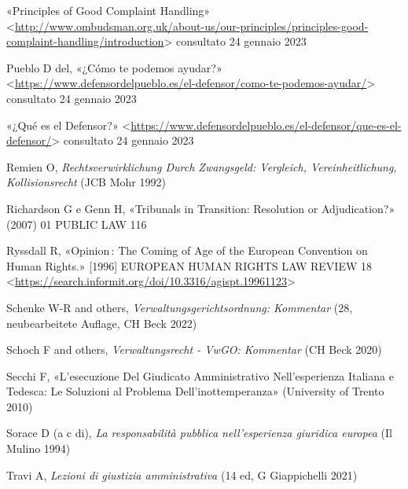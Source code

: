 \documentclass[12pt,it,a4paper,]{report}
\newlength{\cslhangindent}
\newenvironment{CSLReferences}[2] %
 {%
  \setlength{\parindent}{0pt}
  \ifodd #1 \everypar{\setlength{\hangindent}{\cslhangindent}}\ignorespaces\fi
  \ifnum #2 > 0
  \setlength{\parskip}{#2\baselineskip}
  \fi
 }%
 {}
\begin{document}
\begin{CSLReferences}{0}{0}
\leavevmode{}%
{«Principles of {Good Complaint Handling}»}
\textless{}\url{http://www.ombudsman.org.uk/about-us/our-principles/principles-good-complaint-handling/introduction}\textgreater{}
consultato 24 gennaio 2023

\leavevmode{}%
Pueblo D del, {«¿Cómo te podemos ayudar?»}
\textless{}\url{https://www.defensordelpueblo.es/el-defensor/como-te-podemos-ayudar/}\textgreater{}
consultato 24 gennaio 2023

\leavevmode{}%
{«¿Qué es el Defensor?»}
\textless{}\url{https://www.defensordelpueblo.es/el-defensor/que-es-el-defensor/}\textgreater{}
consultato 24 gennaio 2023

\leavevmode{}%
Remien O, \emph{Rechtsverwirklichung Durch {Zwangsgeld}: {Vergleich},
{Vereinheitlichung}, {Kollisionsrecht}} ({JCB Mohr} 1992)

\leavevmode{}%
Richardson G e Genn H, {«Tribunals in Transition: Resolution or
Adjudication?»} (2007) 01 PUBLIC LAW 116

\leavevmode{}%
Ryssdall R, {«Opinion : The Coming of Age of the {European Convention}
on {Human Rights}.»} {[}1996{]} EUROPEAN HUMAN RIGHTS LAW REVIEW 18
\textless{}\url{https://search.informit.org/doi/10.3316/agispt.19961123}\textgreater{}

\leavevmode{}%
Schenke W-R and others, \emph{Verwaltungsgerichtsordnung: Kommentar}
(28, neubearbeitete Auflage, {CH Beck} 2022)

\leavevmode{}%
Schoch F and others, \emph{Verwaltungsrecht - VwGO: Kommentar} ({CH
Beck} 2020)

\leavevmode{}%
Secchi F, {«L'esecuzione Del Giudicato Amministrativo Nell'esperienza
Italiana e Tedesca: Le Soluzioni al Problema Dell'inottemperanza»}
({University of Trento} 2010)

\leavevmode{}%
Sorace D (a c di), \emph{La responsabilità pubblica nell'esperienza
giuridica europea} ({Il Mulino} 1994)

\leavevmode{}%
Travi A, \emph{Lezioni di giustizia amministrativa} (14 ed, {G
Giappichelli} 2021)

\end{CSLReferences}
\end{document}
